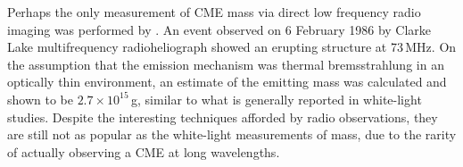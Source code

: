 Perhaps the only measurement of CME mass via direct low frequency radio imaging was performed by \citet{gopalswamy1992}. An event observed on 6 February 1986 by Clarke Lake multifrequency radioheliograph showed an erupting structure at 73\,MHz. On the assumption that the emission mechanism was thermal bremsstrahlung in an optically thin environment, an estimate of the emitting mass was calculated and shown to be $2.7\times10^{15}$\,g, similar to what is generally reported in white-light studies. Despite the interesting techniques afforded by radio observations, they are still not as popular as the white-light measurements of mass, due to the rarity of actually observing a CME at long wavelengths.


